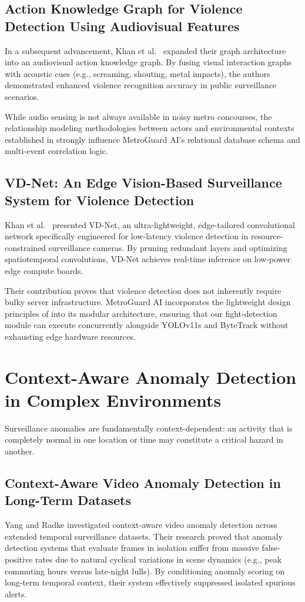 \documentclass[12pt,a4paper]{report}
\begin{document}
\subsection{Action Knowledge Graph for Violence Detection Using Audiovisual Features}
In a subsequent advancement, Khan et al.\ \cite{p12} expanded their graph architecture into an audiovisual action knowledge graph. By fusing visual interaction graphs with acoustic cues (e.g., screaming, shouting, metal impacts), the authors demonstrated enhanced violence recognition accuracy in public surveillance scenarios.

While audio sensing is not always available in noisy metro concourses, the relationship modeling methodologies between actors and environmental contexts established in \cite{p12} strongly influence MetroGuard AI's relational database schema and multi-event correlation logic.

\subsection{VD-Net: An Edge Vision-Based Surveillance System for Violence Detection}
Khan et al.\ \cite{p14} presented VD-Net, an ultra-lightweight, edge-tailored convolutional network specifically engineered for low-latency violence detection in resource-constrained surveillance cameras. By pruning redundant layers and optimizing spatiotemporal convolutions, VD-Net achieves real-time inference on low-power edge compute boards.

Their contribution proves that violence detection does not inherently require bulky server infrastructure. MetroGuard AI incorporates the lightweight design principles of \cite{p14} into its modular architecture, ensuring that our fight-detection module can execute concurrently alongside YOLOv11s and ByteTrack without exhausting edge hardware resources.

\section{Context-Aware Anomaly Detection in Complex Environments}
Surveillance anomalies are fundamentally context-dependent: an activity that is completely normal in one location or time may constitute a critical hazard in another.

\subsection{Context-Aware Video Anomaly Detection in Long-Term Datasets}
Yang and Radke \cite{p9} investigated context-aware video anomaly detection across extended temporal surveillance datasets. Their research proved that anomaly detection systems that evaluate frames in isolation suffer from massive false-positive rates due to natural cyclical variations in scene dynamics (e.g., peak commuting hours versus late-night lulls). By conditioning anomaly scoring on long-term temporal context, their system effectively suppressed isolated spurious alerts.
\end{document}
